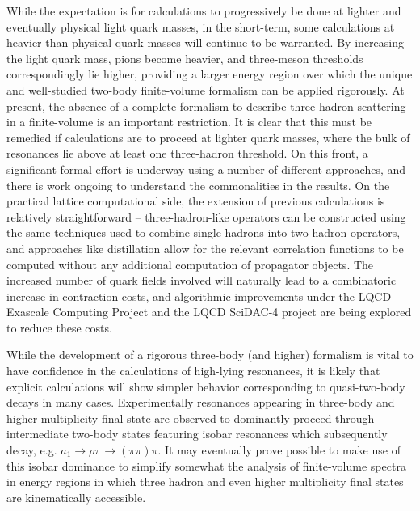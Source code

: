 While the expectation is for calculations to progressively be done at lighter and eventually physical light quark masses, in the short-term, some calculations at heavier than physical quark masses will continue to be warranted. By increasing the light quark mass, pions become heavier, and three-meson thresholds correspondingly lie higher, providing a larger energy region over which the unique and well-studied two-body finite-volume formalism can be applied rigorously. 
At present, the absence of a complete formalism to describe three-hadron scattering in a finite-volume is an important  restriction. It is clear that this must be remedied if calculations are to proceed at lighter quark masses, where the bulk of resonances lie above at least one three-hadron threshold. On this front, a significant formal effort is underway \cite{Polejaeva:2012ut,Hansen:2015zga,Hansen:2014eka,Briceno:2018aml,Doring:2018xxx,Mai:2017bge,Mai:2018djl} using a number of different approaches, and there is work ongoing to understand the commonalities in the results. On the practical lattice computational side, the extension of previous calculations is relatively straightforward -- three-hadron-like operators can be constructed using the same techniques used to combine single hadrons into two-hadron operators, and approaches like distillation \cite{Peardon:2009gh} allow for the relevant correlation functions to be computed without any additional computation of propagator objects. The increased number of quark fields involved will naturally lead to a combinatoric increase in contraction costs, and algorithmic improvements under the LQCD Exascale Computing Project and the LQCD SciDAC-4 project are being explored to reduce these costs.

While the development of a rigorous three-body (and higher) formalism is vital to have confidence in the calculations of high-lying resonances, it is likely that explicit calculations will show simpler behavior corresponding to quasi-two-body decays in many cases. Experimentally resonances appearing in three-body and higher multiplicity final state are observed to dominantly proceed through intermediate two-body states featuring isobar resonances which subsequently decay, e.g. $a_1 \to \rho \pi \to (\pi\pi) \pi$. It may eventually prove possible to make use of this isobar dominance to simplify somewhat the analysis of finite-volume spectra in energy regions in which three hadron and even higher multiplicity final states are kinematically accessible.

